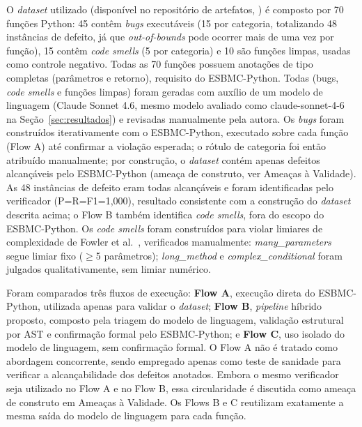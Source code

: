 \documentclass[sigconf]{acmart}
\begin{document}
O \textit{dataset} utilizado (disponível no repositório de artefatos, ) é composto por 70 funções Python: 45 contêm \textit{bugs} executáveis (15 por categoria, totalizando 48 instâncias de defeito, já que \textit{out-of-bounds} pode ocorrer mais de uma vez por função), 15 contêm \textit{code smells} (5 por categoria) e 10 são funções limpas, usadas como controle negativo. Todas as 70 funções possuem anotações de tipo completas (parâmetros e retorno), requisito do ESBMC-Python. Todas (bugs, \textit{code smells} e funções limpas) foram geradas com auxílio de um modelo de linguagem (Claude Sonnet 4.6, mesmo modelo avaliado como claude-sonnet-4-6 na Seção~\ref{sec:resultados}) e revisadas manualmente pela autora. Os \textit{bugs} foram construídos iterativamente com o ESBMC-Python, executado sobre cada função (Flow A) até confirmar a violação esperada; o rótulo de categoria foi então atribuído manualmente; por construção, o \textit{dataset} contém apenas defeitos alcançáveis pelo ESBMC-Python (ameaça de construto, ver Ameaças à Validade). As 48 instâncias de defeito eram todas alcançáveis e foram identificadas pelo verificador (P=R=F1=1,000), resultado consistente com a construção do \textit{dataset} descrita acima; o Flow B também identifica \textit{code smells}, fora do escopo do ESBMC-Python. Os \textit{code smells} foram construídos para violar limiares de complexidade de Fowler et al.~\cite{fowler1999refactoring}, verificados manualmente: \textit{many\_parameters} segue limiar fixo ($\geq$5 parâmetros); \textit{long\_method} e \textit{complex\_conditional} foram julgados qualitativamente, sem limiar numérico.

Foram comparados três fluxos de execução: \textbf{Flow A}, execução direta do ESBMC-Python, utilizada apenas para validar o \textit{dataset}; \textbf{Flow B}, \textit{pipeline} híbrido proposto, composto pela triagem do modelo de linguagem, validação estrutural por AST e confirmação formal pelo ESBMC-Python; e \textbf{Flow C}, uso isolado do modelo de linguagem, sem confirmação formal. O Flow A não é tratado como abordagem concorrente, sendo empregado apenas como teste de sanidade para verificar a alcançabilidade dos defeitos anotados. Embora o mesmo verificador seja utilizado no Flow A e no Flow B, essa circularidade é discutida como ameaça de construto em Ameaças à Validade. Os Flows B e C reutilizam exatamente a mesma saída do modelo de linguagem para cada função.
\end{document}
